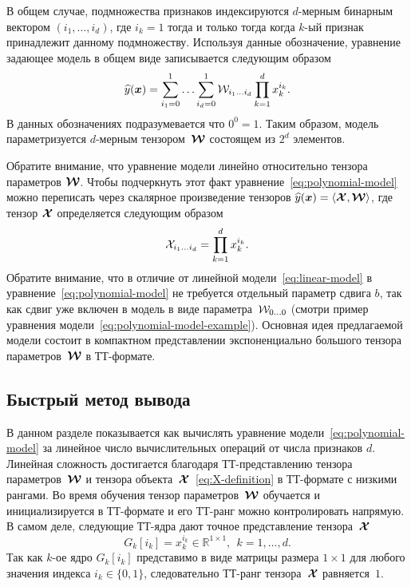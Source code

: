 В общем случае, подмножества признаков индексируются $d$-мерным бинарным вектором $(i_1, \ldots, i_d)$, где $i_k = 1$ тогда и только тогда когда $k$-ый признак принадлежит данному подмножеству. Используя данные обозначение, уравнение задающее модель в общем виде записывается следующим образом
\begin{equation}
\label{eq:polynomial-model}
\widehat{y}(\boldsymbol{x}) = \sum_{i_1=0}^1 \ldots \sum_{i_d=0}^1 \mathcal{W}_{i_1 \ldots i_d} \prod_{k=1}^d x_k^{i_k}.
\end{equation}
В данных обозначениях подразумевается что $0^0 = 1$.
Таким образом, модель параметризуется $d$-мерным тензором~$\boldsymbol{\mathcal{W}}$ состоящем из $2^d$ элементов.

Обратите внимание, что уравнение модели линейно относительно тензора параметров $\boldsymbol{\mathcal{W}}$. Чтобы подчеркнуть этот факт уравнение~\eqref{eq:polynomial-model} можно переписать через скалярное произведение тензоров $\widehat{y}(\boldsymbol{x}) = \langle \boldsymbol{\mathcal{X}}, \boldsymbol{\mathcal{W}} \rangle$, где тензор $\boldsymbol{\mathcal{X}}$ определяется следующим образом
\begin{equation}
\label{eq:X-definition}
\mathcal{X}_{i_1 \ldots i_d} = \prod_{k=1}^d x_k^{i_k}.
\end{equation}
Обратите внимание, что в отличие от линейной модели~\eqref{eq:linear-model} в уравнение~\eqref{eq:polynomial-model} не требуется отдельный параметр сдвига $b$, так как сдвиг уже включен в модель в виде параметра~$\mathcal{W}_{0 \ldots 0}$ (смотри пример уравнения модели~\eqref{eq:polynomial-model-example}).
Основная идея предлагаемой модели состоит в компактном представлении экспоненциально большого тензора параметров~$\boldsymbol{\mathcal{W}}$ в ТТ-формате.

\subsection{Быстрый метод вывода}
В данном разделе показывается как вычислять уравнение модели~\eqref{eq:polynomial-model} за линейное число вычислительных операций от числа признаков $d$. Линейная сложность достигается благодаря ТТ-представлению тензора параметров~$\boldsymbol{\mathcal{W}}$ и тензора объекта~$\boldsymbol{\mathcal{X}}$~\eqref{eq:X-definition} в ТТ-формате с низкими рангами. 
Во время обучения тензор параметров~$\boldsymbol{\mathcal{W}}$ обучается и инициализируется в ТТ-формате и его ТТ-ранг можно контролировать напрямую. В самом деле, следующие ТТ-ядра дают точное представление тензора~$\boldsymbol{\mathcal{X}}$
\begin{equation*}
G_k[i_k] = x_k^{i_k} \in \mathbb{R}^{1 \times 1}, ~~ k=1, \ldots, d.
\end{equation*}
Так как $k$-ое ядро $G_k[i_k]$ представимо в виде матрицы размера $1 \times 1$ для любого значения индекса $i_k \in \{0, 1\}$, следовательно ТТ-ранг тензора~$\boldsymbol{\mathcal{X}}$ равняется~$1$.

